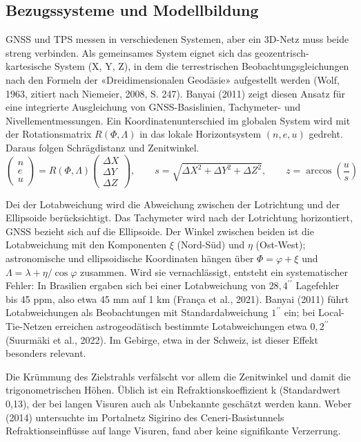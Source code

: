 \subsection{Bezugssysteme und Modellbildung}
\label{sec:Bezugssysteme und Modellbildung}
GNSS und TPS messen in verschiedenen Systemen, aber ein 3D-Netz muss beide streng verbinden. 
Als gemeinsames System eignet sich das geozentrisch-kartesische System (X, Y, Z), in dem die terrestrischen Beobachtungsgleichungen nach den Formeln der «Dreidimensionalen Geodäsie» aufgestellt werden (Wolf, 1963, zitiert nach Niemeier, 2008, S. 247). 
Banyai (2011) zeigt diesen Ansatz für eine integrierte Ausgleichung von GNSS-Basislinien, Tachymeter- und Nivellementmessungen.
Ein Koordinatenunterschied im globalen System wird mit der Rotationsmatrix \(R(\Phi, \Lambda)\) in das lokale Horizontsystem \((n, e, u)\) gedreht. Daraus folgen Schrägdistanz und Zenitwinkel.
\[
\begin{pmatrix} n \\ e \\ u \end{pmatrix} = R(\Phi, \Lambda)\begin{pmatrix} \Delta X \\ \Delta Y \\ \Delta Z \end{pmatrix}, \qquad s = \sqrt{\Delta X^2 + \Delta Y^2 + \Delta Z^2}, \qquad z = \arccos\left(\frac{u}{s}\right)
\]

Dei der Lotabweichung wird die Abweichung zwischen der Lotrichtung und der Ellipsoide berücksichtigt. 
Das Tachymeter wird nach der Lotrichtung horizontiert, GNSS bezieht sich auf die Ellipsoide. Der Winkel zwischen beiden ist die Lotabweichung mit den Komponenten \(\xi\) (Nord-Süd) und \(\eta\) (Ost-West); astronomische und ellipsoidische Koordinaten hängen über \(\Phi = \varphi + \xi\) und \(\Lambda = \lambda + \eta / \cos\varphi\) zusammen.
Wird sie vernachlässigt, entsteht ein systematischer Fehler: In Brasilien ergaben sich bei einer Lotabweichung von $28{,}4^{\prime\prime}$ Lagefehler bis 45 ppm, also etwa 45 mm auf 1 km (França et al., 2021).
Banyai (2011) führt Lotabweichungen als Beobachtungen mit Standardabweichung $1^{\prime\prime}$ ein; bei Local-Tie-Netzen erreichen astrogeodätisch bestimmte Lotabweichungen etwa $0{,}2^{\prime\prime}$ (Suurmäki et al., 2022).
Im Gebirge, etwa in der Schweiz, ist dieser Effekt besonders relevant.\bigskip 

Die Krümmung des Zielstrahls verfälscht vor allem die Zenitwinkel und damit die trigonometrischen Höhen.
Üblich ist ein Refraktionskoeffizient k (Standardwert 0,13), der bei langen Visuren auch als Unbekannte geschätzt werden kann. 
Weber (2014) untersuchte im Portalnetz Sigirino des Ceneri-Basistunnels Refraktionseinflüsse auf lange Visuren, fand aber keine signifikante Verzerrung. \bigskip 

